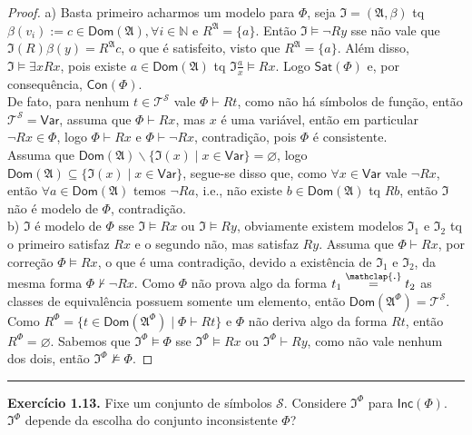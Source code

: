 \documentclass[11pt]{article}
\newcommand{\mc}[1]{\mathcal{#1}}
\newcommand{\mf}[1]{\mathfrak{#1}}
\newcommand{\msf}[1]{\mathsf{#1}}
\newcommand{\mbb}[1]{\mathbb{#1}}
\newcommand\overtext[2]{\stackrel{\mathclap{\normalfont\mbox{#1}}}{#2}}
\begin{document}
\begin{proof}
    a) Basta primeiro acharmos um modelo para $\Phi$, seja $\mf{I}=(\mf{A},\beta)$ tq $\beta(v_i):=c\in\msf{Dom}(\mf{A}),\forall i\in\mbb{N}$ e $R^\mf{A}=\{a\}$. Então $\mf{I}\vDash\neg Ry$ sse não vale que $\mf{I}(R)\beta(y)=R^\mf{A}c$, o que é satisfeito, visto que $R^\mf{A}=\{a\}$. Além disso, $\mf{I}\vDash\exists xRx$, pois existe $a\in \msf{Dom}(\mf{A})$ tq $\mf{I}\frac{a}{x}\vDash Rx$. Logo $\msf{Sat}(\Phi)$ e, por consequência, $\msf{Con}(\Phi)$.\\
    De fato, para nenhum $t\in\mc{T}^\mc{S}$ vale $\Phi\vdash Rt$, como não há símbolos de função, então $\mc{T}^\mc{S}=\msf{Var}$, assuma que $\Phi\vdash Rx$, mas $x$ é uma variável, então em particular $\neg Rx\in\Phi$, logo $\Phi\vdash Rx$ e $\Phi\vdash\neg Rx$, contradição, pois $\Phi$ é consistente.\\
    Assuma que $\msf{Dom}(\mf{A})\backslash\{\mf{I}(x)\mid x\in\msf{Var}\}=\varnothing$, logo $\msf{Dom}(\mf{A})\subseteq\{\mf{I}(x) \mid x\in\msf{Var}\}$, segue-se disso que, como $\forall x\in\msf{Var}$ vale $\neg Rx$, então $\forall a\in\msf{Dom}(\mf{A})$ temos $\neg Ra$, i.e., não existe $b\in\msf{Dom}(\mf{A})$ tq $Rb$, então $\mf{I}$ não é modelo de $\Phi$, contradição.\\
    b) $\mf{I}$ é modelo de $\Phi$ sse $\mf{I}\vDash Rx$ ou $\mf{I}\vDash Ry$, obviamente existem modelos $\mf{I}_1$ e $\mf{I}_2$ tq o primeiro satisfaz $Rx$ e o segundo não, mas satisfaz $Ry$. Assuma que $\Phi\vdash Rx$, por correção $\Phi\vDash Rx$, o que é uma contradição, devido a existência de $\mf{I}_1$ e $\mf{I}_2$, da mesma forma $\Phi\nvdash\neg Rx$. Como $\Phi$ não prova algo da forma $t_1\overtext{.}{=}t_2$ as classes de equivalência possuem somente um elemento, então $\msf{Dom}(\mf{A}^\Phi)=\mc{T}^\mc{S}$. Como $R^\Phi=\{t\in\msf{Dom}(\mf{A}^\Phi) \mid \Phi\vdash Rt\}$ e $\Phi$ não deriva algo da forma $Rt$, então $R^\Phi=\varnothing$. Sabemos que $\mf{I}^\Phi\vDash\Phi$ sse $\mf{I}^\Phi\vDash Rx$ ou $\mf{I}^\Phi\vdash Ry$, como não vale nenhum dos dois, então $\mf{I}^\Phi\nvDash\Phi$.
\end{proof}

\hrule

\begin{shaded}
\textbf{Exercício 1.13.} Fixe um conjunto de símbolos $\mc{S}$. Considere $\mf{I}^\Phi$ para $\msf{Inc}(\Phi)$. $\mf{I}^\Phi$ depende da escolha do conjunto inconsistente $\Phi$?
\end{shaded}
\end{document}
